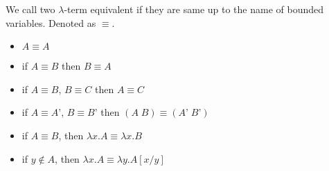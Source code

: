 \begin{definition}[Equivalent] We call two $\lambda$-term equivalent if they are same up to the name of bounded variables. Denoted as $\equiv$.
\begin{itemize}
\item
  \(A \equiv A\)
\item
  if \(A \equiv B\) then \(B \equiv A\)
\item
  if \(A \equiv B\), \(B \equiv C\) then \(A \equiv C\)
\item
  if \(A \equiv A’\), \(B \equiv B’\) then \((A\;B) \equiv (A’\;B’)\)
\item
  if \(A \equiv B\), then \(\lambda x.A \equiv \lambda x.B\)
\item
  if \(y \not \in A\), then
  \(\lambda x.A \equiv \lambda y.A[x/y]\)
\end{itemize}
\end{definition}




